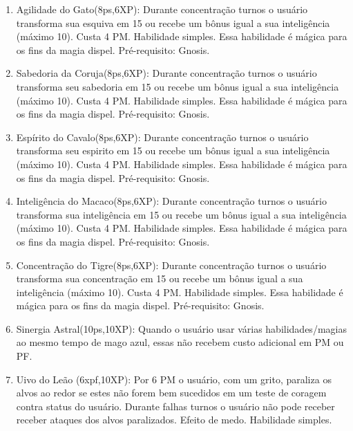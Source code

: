 \begin{enumerate}
	\item Agilidade do Gato(8ps,6XP): Durante concentração turnos o usuário transforma sua esquiva em 15 ou recebe um bônus igual a sua inteligência (máximo 10). Custa 4 PM. Habilidade simples. Essa habilidade é mágica para os fins da magia dispel. Pré-requisito: Gnosis.

	\item Sabedoria da Coruja(8ps,6XP): Durante concentração turnos o usuário transforma seu sabedoria em 15 ou recebe um bônus igual a sua inteligência (máximo 10). Custa 4 PM. Habilidade simples. Essa habilidade é mágica para os fins da magia dispel. Pré-requisito: Gnosis.

	\item Espírito do Cavalo(8ps,6XP): Durante concentração turnos o usuário transforma seu espirito em 15 ou recebe um bônus igual a sua inteligência (máximo 10). Custa 4 PM. Habilidade simples. Essa habilidade é mágica para os fins da magia dispel. Pré-requisito: Gnosis.

	\item Inteligência do Macaco(8ps,6XP): Durante concentração turnos o usuário transforma sua inteligência em 15 ou recebe um bônus igual a sua inteligência (máximo 10). Custa 4 PM. Habilidade simples. Essa habilidade é mágica para os fins da magia dispel. Pré-requisito: Gnosis.

	\item Concentração do Tigre(8ps,6XP): Durante concentração turnos o usuário transforma sua concentração em 15 ou recebe um bônus igual a sua inteligência (máximo 10). Custa 4 PM. Habilidade simples. Essa habilidade é mágica para os fins da magia dispel. Pré-requisito: Gnosis.

	\item Sinergia Astral(10ps,10XP): Quando o usuário usar várias habilidades/magias ao mesmo tempo de mago azul, essas não recebem custo adicional em PM ou PF. 

	\item Uivo do Leão (6xpf,10XP): Por 6 PM o usuário, com um grito, paraliza os alvos ao redor se estes não forem bem sucedidos em um teste de coragem contra status do usuário. Durante falhas turnos o usuário não pode receber receber ataques dos alvos paralizados. Efeito de medo. Habilidade simples.


\end{enumerate}

